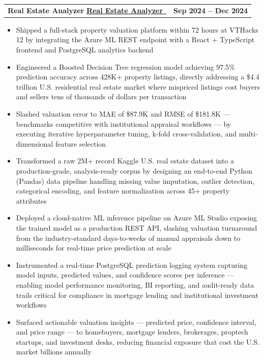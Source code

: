 \documentclass[letterpaper,11pt]{article}
\makeatletter
\newcommand{\resumeItem}[1]{
  \item\small{{#1 \vspace{-2pt}}}
}
\newcommand{\resumeProjectHeading}[4]{%
  \vspace{-2pt}\item
  \begin{tabular*}{1.001\textwidth}{l@{\extracolsep{\fill}}r}
    \small{%
      \ifthenelse{\equal{#1}{}}%
        {%
          \textbf{#2}%
          \ifthenelse{\equal{#3}{}}{}{ $|$ \emph{#3}}%
        }%
        {%
          \href{#1}{\underline{\textbf{#2}}~\faLink}%
          \ifthenelse{\equal{#3}{}}{}{ $|$ \emph{#3}}%
        }%
    } & \textbf{\small #4} \\
  \end{tabular*}\vspace{-7pt}
}
\newcommand{\resumeItemListStart}{\begin{itemize}}
\newcommand{\resumeItemListEnd}{\end{itemize}\vspace{-5pt}}
\makeatother
\begin{document}
        \resumeProjectHeading
            {https://real-estate-analyzer-iota.vercel.app/}
            {Real Estate Analyzer}
            {React, TypeScript, Python (Pandas), PostgreSQL, Azure, REST APIs}
            {Sep 2024 -- Dec 2024}
            \resumeItemListStart
                \resumeItem{Shipped a full-stack property valuation platform within 72 hours at VTHacks 12 by integrating the Azure ML REST endpoint with a React + TypeScript frontend and PostgreSQL analytics backend}
                \resumeItem{Engineered a Boosted Decision Tree regression model achieving 97.5\% prediction accuracy across 428K+ property listings, directly addressing a \$4.4 trillion U.S. residential real estate market where mispriced listings cost buyers and sellers tens of thousands of dollars per transaction}
                \resumeItem{Slashed valuation error to MAE of \$87.9K and RMSE of \$181.8K — benchmarks competitive with institutional appraisal workflows — by executing iterative hyperparameter tuning, k-fold cross-validation, and multi-dimensional feature selection}
                \resumeItem{Transformed a raw 2M+ record Kaggle U.S. real estate dataset into a production-grade, analysis-ready corpus by designing an end-to-end Python (Pandas) data pipeline handling missing value imputation, outlier detection, categorical encoding, and feature normalization across 45+ property attributes}
                \resumeItem{Deployed a cloud-native ML inference pipeline on Azure ML Studio exposing the trained model as a production REST API, slashing valuation turnaround from the industry-standard days-to-weeks of manual appraisals down to milliseconds for real-time price prediction at scale}
                \resumeItem{Instrumented a real-time PostgreSQL prediction logging system capturing model inputs, predicted values, and confidence scores per inference — enabling model performance monitoring, BI reporting, and audit-ready data trails critical for compliance in mortgage lending and institutional investment workflows}
                \resumeItem{Surfaced actionable valuation insights — predicted price, confidence interval, and price range — to homebuyers, mortgage lenders, brokerages, proptech startups, and investment desks, reducing financial exposure that cost the U.S. market billions annually}
            \resumeItemListEnd
        \vspace{-10pt}
\end{document}
